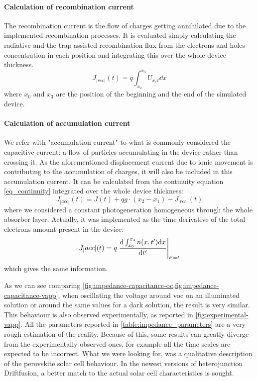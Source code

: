 	\paragraph{Calculation of recombination current}\label{impedance_recombination}
	The recombination current is the flow of charges getting annihilated due to the implemented recombination processes.
	It is evaluated simply calculating the radiative and the trap assisted recombination flux from the electrons and holes concentration in each position and integrating this over the whole device thickness.
	\begin{equation}
	J_|rec|(t) = q \int_{x_0}^{x_3} U_{x,t} \dd x
	\end{equation}
	where $x_0$ and $x_3$ are the position of the beginning and the end of the simulated device.
	
	\paragraph{Calculation of accumulation current}\label{impedance_accumulation}
	We refer with "accumulation current" to what is commonly considered the capacitive current: a flow of particles accumulating in the device rather than crossing it. 
	As the aforementioned displacement current due to ionic movement is contributing to the accumulation of charges, it will also be included in this accumulation current.
	It can be calculated from the continuity equation \cref{eq_continuity} integrated over the whole device thickness:
\begin{equation}
				J_|acc|(t) = J(t) + qg \cdot (x_2-x_1) - J_|rec|(t)
\end{equation}
	where we considered a constant photogeneration homogeneous through the whole absorber layer.
	Actually, it was implemented as the time derivative of the total electrons amount present in the device:
	\begin{equation}
	J_|acc|(t) = q\eval{\dv{\int_{x_0}^{x_3} n(x,t') \dd x}{t'}}_{t'=t}
	\end{equation}
	which gives the same information.



As we can see comparing \cref{fig:impedance-capacitance-oc,fig:impedance-capacitance-vapp}, when oscillating the voltage around \gls{voc} on an illuminated solution or around the same values for a dark solution, the result is very similar.
This behaviour is also observed experimentally, as reported in \cref{fig:experimental-vapp}.
All the parameters reported in \cref{table:impedance_parameters} are a very rough estimation of the reality.
Because of this, some results can greatly diverge from the experimentally observed ones, for example all the time scales are expected to be incorrect.
What we were looking for, was a qualitative description of the perovskite solar cell behaviour.
In the newest versions of heterojunction Driftfusion, a better match to the actual solar cell characteristics is sought.

